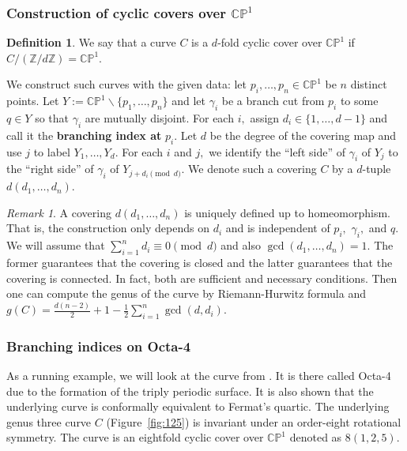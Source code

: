 \documentclass[12pt,reqno]{amsart}
\newcommand{\Z}{\mathbb{Z}}
\theoremstyle{definition}
\newtheorem{defn}{Definition}
\theoremstyle{remark}
\newtheorem*{remark}{Remark}
\begin{document}
\subsubsection*{Construction of cyclic covers over $\mathbb{C}\mathbb{P}^1$}
\begin{defn} We say that a curve $C$ is a $d$-fold cyclic cover over $\mathbb{C}\mathbb{P}^1$ if $C / (\Z/ d \Z) = \mathbb{C}\mathbb{P}^1.$ \end{defn}

We construct such curves with the given data: let $p_i, \ldots , p_n \in \mathbb{C}\mathbb{P}^1$ be $n$ distinct points. Let $Y := \mathbb{C}\mathbb{P}^1 \backslash \{p_1, \ldots, p_n\}$ and let $\gamma_i$ be a branch cut from $p_i$ to some $q \in Y$ so that $\gamma_i$ are mutually disjoint. For each $i,$ assign $d_i \in \{1, \ldots, d - 1\}$ and call it the \textbf{branching index at} $p_i.$ Let $d$ be the degree of the covering map and use $j$ to label $Y_1, \ldots , Y_d.$ For each $i$ and $j,$ we identify the ``left side'' of $\gamma_i$ of $Y_j$ to the ``right side'' of $\gamma_i$ of $Y_{j + d_i \pmod d}.$ We denote such a covering $C$ by a $d$-tuple $d (d_1, \ldots , d_n).$


\begin{remark} A covering $d (d_1, \ldots , d_n)$ is uniquely defined up to homeomorphism. That is, the construction only depends on $d_i$ and is independent of $p_i,$ $\gamma_i,$ and $q.$ We will assume that $\sum\limits_{i=1}^n d_i \equiv 0 \pmod d$ and also $\gcd (d_1, \ldots, d_n) = 1.$ The former guarantees that the covering is closed and the latter guarantees that the covering is connected. In fact, both are sufficient and necessary conditions. Then one can compute the genus of the curve by Riemann-Hurwitz formula and $g(C) = \frac{d (n-2)}{2} + 1 - \frac{1}{2} \sum\limits_{i=1}^n \gcd(d,d_i).$ 
\end{remark}

\subsubsection*{Branching indices on Octa-4}
As a running example, we will look at the curve from \cite{dami}. It is there called Octa-4 due to the formation of the triply periodic surface. It is also shown that the underlying curve is conformally equivalent to Fermat's quartic. The underlying genus three curve $C$ (Figure~\ref{fig:125}) is invariant under an order-eight rotational symmetry. The curve is an eightfold cyclic cover over $\mathbb{C}\mathbb{P}^1$ denoted as $8 (1, 2, 5).$
\end{document}
